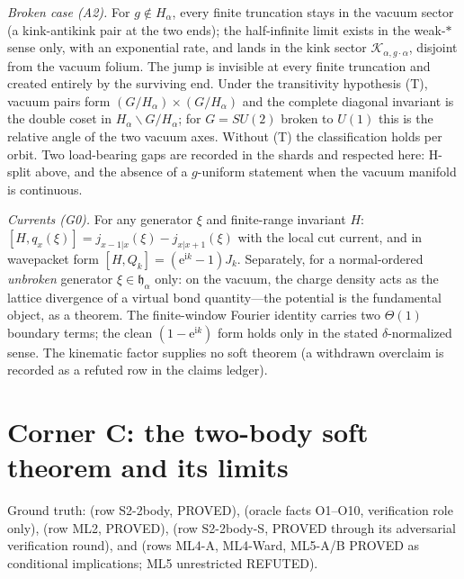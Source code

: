 \documentclass[aps,prl,twocolumn,superscriptaddress,longbibliography,floatfix]{revtex4-2}
\newcommand{\ic}{\ensuremath{\mathrm{i}}}
\newcommand{\ec}{\ensuremath{\mathrm{e}}}
\begin{document}
\emph{Broken case (A2).} For $g\notin H_\alpha$, every finite truncation
stays in the vacuum sector (a kink-antikink pair at the two ends); the
half-infinite limit exists in the weak-$*$ sense only, with an exponential
rate, and lands in the kink sector $\mathcal{K}_{\alpha,g\cdot\alpha}$,
disjoint from the vacuum folium. The jump is invisible at every finite
truncation and created entirely by the surviving end. Under the
transitivity hypothesis (T), vacuum pairs form
$(G/H_\alpha)\times(G/H_\alpha)$ and the complete diagonal invariant is the
double coset in $H_\alpha\backslash G/H_\alpha$; for $G=SU(2)$ broken to
$U(1)$ this is the relative angle of the two vacuum axes. Without (T) the
classification holds per orbit. Two load-bearing gaps are recorded in the
shards and respected here: H-split above, and the absence of a
$g$-uniform statement when the vacuum manifold is continuous.

\emph{Currents (G0).} For any generator $\xi$ and finite-range invariant
$H$: $[H,q_x(\xi)]=j_{x-1|x}(\xi)-j_{x|x+1}(\xi)$ with the local cut
current, and in wavepacket form $[H,Q_k]=(\ec^{\ic k}-1)J_k$. Separately,
for a normal-ordered \emph{unbroken} generator $\xi\in\mathfrak{h}_\alpha$
only: on the vacuum, the charge density acts as the lattice divergence of a
virtual bond quantity---the potential is the fundamental object, as a
theorem. The
finite-window Fourier identity carries two $\Theta(1)$ boundary terms; the
clean $(1-\ec^{\ic k})$ form holds only in the stated $\delta$-normalized
sense. The kinematic factor supplies no soft theorem (a withdrawn overclaim
is recorded as a refuted row in the claims ledger).

\section{Corner C: the two-body soft theorem and its limits}
\label{app:soft}

\begingroup\raggedright
Ground truth:  (row S2-2body, PROVED),
 (oracle facts O1--O10, verification role
only),  (row ML2, PROVED),
 (row S2-2body-S, PROVED through its
adversarial verification round),
 and
 (rows ML4-A, ML4-Ward, ML5-A/B PROVED
as conditional implications; ML5 unrestricted REFUTED).
\par\endgroup
\end{document}
